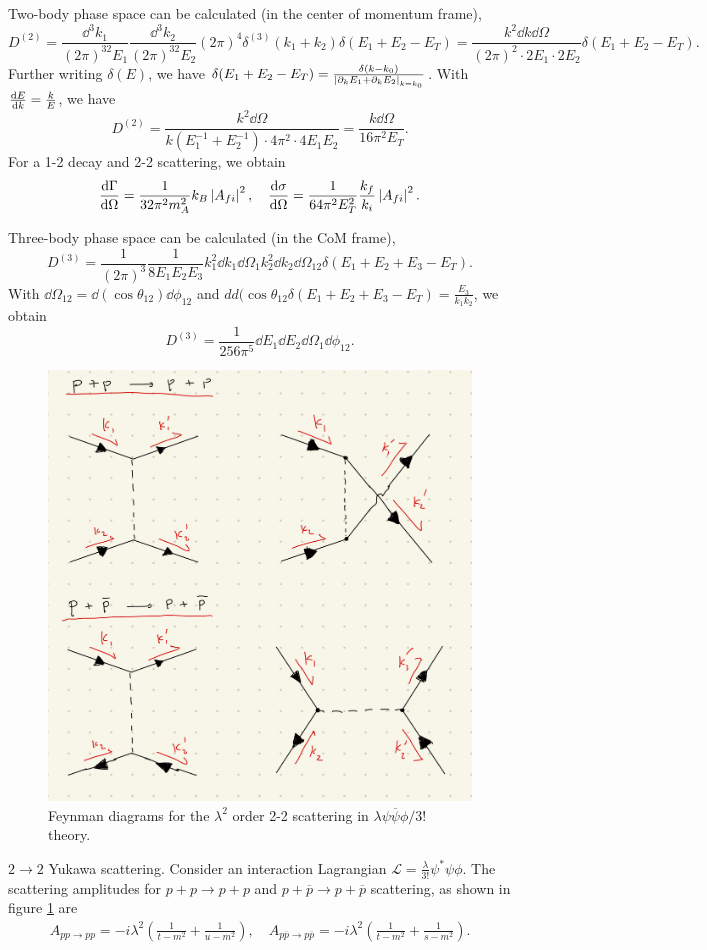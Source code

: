 \documentclass{article}
\begin{document}
\example Two-body phase space can be calculated (in the center of momentum frame),
$$D^{(2)}=\frac{\dd^3k_1}{(2\pi)^32E_1}\frac{\dd^3k_2}{(2\pi)^32E_2}(2\pi)^4\delta^{(3)}(k_1+k_2)\delta(E_1+E_2-E_T)=\frac{k^2\dd k\dd\Omega}{(2\pi)^2\cdot 2E_1\cdot 2E_2}\delta(E_1+E_2-E_T).$$
Further writing $\delta(E)$, we have $\delta(E_1+E_2-E_T)=\frac{\delta(k-k_0)}{\left\lvert\partial_kE_1+\partial_kE_2\right\rvert_{k=k_0}}$. With $\frac{\mathrm{d}E}{\mathrm{d}k}=\frac k{E}$, we have 
\begin{equation}
    D^{(2)}=\frac{k^2\dd\Omega}{k(E_1^{-1}+E_2^{-1})\cdot 4\pi^2\cdot 4E_1E_2}=\frac{k\dd\Omega}{16\pi^2E_T}.
\end{equation}
For a 1-2 decay and 2-2 scattering, we obtain
$$\frac{\mathrm{d}\Gamma}{\mathrm{d}\Omega}=\frac{1}{32\pi^2m_A^2}k_B\left\lvert A_{fi}\right\rvert^2,\quad\frac{\mathrm{d}\sigma}{\mathrm{d}\Omega}=\frac 1{64\pi^2E_T^2}\frac{k_f}{k_i}\left\lvert A_{fi}\right\rvert^2.$$

\example Three-body phase space can be calculated (in the CoM frame),
$$D^{(3)}=\frac 1{(2\pi)^3}\frac 1{8E_1E_2E_3}k^2_1\dd k_1\dd\Omega_1k^2_2\dd k_2\dd\Omega_{12}\delta(E_1+E_2+E_3-E_T).$$
With $\dd\Omega_{12}=\dd(\cos\theta_{12})\dd\phi_{12}$ and $dd(\cos\theta_{12}\delta(E_1+E_2+E_3-E_T)=\frac{E_3}{k_1k_2}$, we obtain
$$D^{(3)}=\frac 1{256\pi^5}\dd E_1\dd E_2\dd\Omega_1\dd\phi_{12}.$$

\begin{figure}[h]
    \centering
    \includegraphics[width=0.5\linewidth]{images/qft-images/yukawastuchannels.jpg}
    \caption{Feynman diagrams for the $\lambda^2$ order 2-2 scattering in $\lambda\psi\overline\psi\phi/3!$ theory. }
    \label{fig:yukawastuchannels}
\end{figure}

\example $2\to 2$ Yukawa scattering. Consider an interaction Lagrangian $\mathcal L=\frac\lambda{3!}\psi^*\psi\phi$. The scattering amplitudes  for $p+p\to p+p$ and $p+\overline p\to p+\overline p$ scattering, as shown in figure \ref{fig:yukawastuchannels} are 
\begin{align*}
    A_{pp\to pp}=-i\lambda^2\left(\frac 1{t-m^2}+\frac 1{u-m^2}\right),\quad A_{p\overline p\to p\overline p}=-i\lambda^2\left(\frac 1{t-m^2}+\frac 1{s-m^2}\right).
\end{align*}
\end{document}
